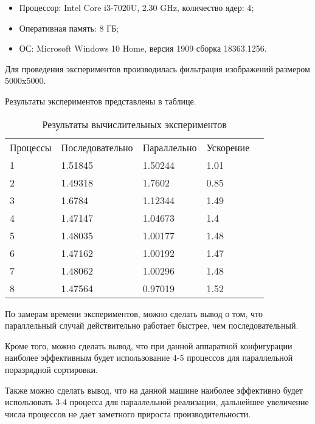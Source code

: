 \documentclass{report}
\begin{document}
\begin{itemize}
\item Процессор: Intel Core i3-7020U, 2.30 GHz, количество ядер: 4;
\item Оперативная память: 8 ГБ;
\item ОС: Microsoft Windows 10 Home, версия 1909 сборка 18363.1256.
\end{itemize}

\par Для проведения экспериментов производилась фильтрация изображений размером 5000x5000. 
\par Результаты экспериментов представлены в таблице.

\begin{table}[!h]
\caption{Результаты вычислительных экспериментов}
\centering
\begin{tabular}{lllll}
Процессы & Последовательно & Параллельно & Ускорение  \\
1        & 1.51845          & 1.50244     & 1.01       \\
2        & 1.49318         & 1.7602     & 0.85       \\
3        & 1.6784         & 1.12344     & 1.49       \\
4        & 1.47147        & 1.04673     & 1.4       \\
5        & 1.48035         & 1.00177     & 1.48       \\
6        & 1.47162         & 1.00192     & 1.47     \\
7        & 1.48062         & 1.00296     & 1.48       \\
8        & 1.47564        & 0.97019    & 1.52
\end{tabular}
\end{table}

\par По замерам времени экспериментов, можно сделать вывод о том, что параллельный случай действительно работает быстрее, чем последовательный. 
\par Кроме того, можно сделать вывод, что при данной аппаратной конфигурации наиболее эффективным будет использование 4-5 процессов для параллельной поразрядной сортировки.
\par Также можно сделать вывод, что на данной машине наиболее эффективно будет использовать 3-4 процесса для параллельной реализации, дальнейшее увеличение числа процессов не дает заметного прироста производительности.
\newpage

\end{document}
